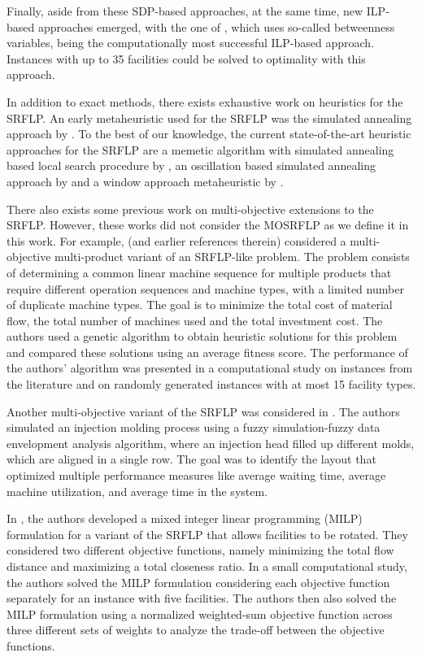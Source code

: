 \documentclass{article}
\newcommand{\SRFLP}{SRFLP\xspace}
\newcommand{\MOSRFLP}{MOSRFLP\xspace}
\begin{document}
Finally, aside from these SDP-based approaches, at the same time, new ILP-based approaches emerged, with the one of \citet{amaral_new_2009}, which uses so-called betweenness variables, being the computationally most successful ILP-based approach. Instances with up to 35 facilities could be solved to optimality with this approach. 

In addition to exact methods, there exists exhaustive work on heuristics for the \SRFLP. An early metaheuristic used for the \SRFLP was the simulated annealing approach by \citet{Heragu1992}. To the best of our knowledge, the current state-of-the-art heuristic approaches for the \SRFLP are a memetic algorithm with simulated annealing based local search procedure by \citet{Tang2023}, an oscillation based simulated annealing approach by \citet{CHEN2025} and a window approach metaheuristic by \citet{PAMMER2026}.

There also exists some previous work on multi-objective extensions to the \SRFLP. However, these works did not consider the \MOSRFLP as we define it in this work. For example, \citet{Lenin2018} (and earlier references therein) considered a multi-objective multi-product variant of an \SRFLP-like problem. The problem consists of determining a
common linear machine sequence for multiple products that require different operation sequences and machine types, with a
limited number of duplicate machine types.
The goal is to minimize the total cost of material flow, the total number of machines used and the total investment cost. The authors used a genetic algorithm to obtain heuristic solutions for this problem and compared these solutions using an average fitness score.
The performance of the authors' algorithm was presented in a computational study on instances from the literature and on randomly generated instances with at most 15 facility types.

Another multi-objective variant of the \SRFLP was considered in \citet{Azadeh2011}. The authors simulated an injection molding process using a fuzzy simulation-fuzzy data envelopment analysis algorithm, where an injection head filled up different molds, which are aligned in a single row. The goal was to identify the layout that optimized multiple performance measures like average waiting time, average machine utilization, and average time in the system.


In \citet{Ouhoud2025}, the authors developed a mixed integer linear programming (MILP) formulation for a variant of the \SRFLP that allows facilities to be rotated. They considered two different objective functions, namely minimizing the total flow distance and maximizing a total closeness ratio. In a small computational study, the authors solved the MILP formulation considering each objective function separately for an instance with five facilities. The authors then also solved the MILP formulation using a normalized weighted-sum objective function across three different sets of weights to analyze the trade-off between the objective functions.
\end{document}
